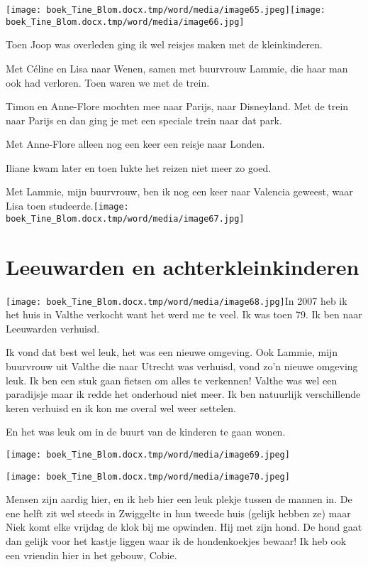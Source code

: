 \documentclass{scrbook}
\begin{document}
{\texttt{[image: boek\_Tine\_Blom.docx.tmp/word/media/image65.jpeg]}\texttt{[image: boek\_Tine\_Blom.docx.tmp/word/media/image66.jpg]}

Toen Joop was overleden ging ik wel reisjes maken met de kleinkinderen. 

Met C\'{e}line en Lisa naar Wenen, samen met buurvrouw Lammie, die haar man ook had verloren. Toen waren we met de trein. 

Timon en Anne-Flore mochten mee naar Parijs, naar Disneyland. Met de trein naar Parijs en dan ging je met een speciale trein naar dat park. 

Met Anne-Flore alleen nog een keer een reisje naar Londen. 

Iliane kwam later en toen lukte het reizen niet meer zo goed. 

Met Lammie, mijn buurvrouw, ben ik nog een keer naar Valencia geweest, waar Lisa toen studeerde.\texttt{[image: boek\_Tine\_Blom.docx.tmp/word/media/image67.jpg]} 

\chapter{\label{ref-014}Leeuwarden en achterkleinkinderen}

\texttt{[image: boek\_Tine\_Blom.docx.tmp/word/media/image68.jpg]}In 2007 heb ik het huis in Valthe verkocht want het werd me te veel. Ik was toen 79. Ik ben naar Leeuwarden verhuisd.

Ik vond dat best wel leuk, het was een nieuwe omgeving. Ook Lammie, mijn buurvrouw uit Valthe die naar Utrecht was verhuisd, vond zo’n nieuwe omgeving leuk. Ik ben een stuk gaan fietsen om alles te verkennen! Valthe was wel een paradijsje maar ik redde het onderhoud niet meer. Ik ben natuurlijk verschillende keren verhuisd en ik kon me overal wel weer settelen. 

En het was leuk om in de buurt van de kinderen te gaan wonen. 

\texttt{[image: boek\_Tine\_Blom.docx.tmp/word/media/image69.jpeg]}

\texttt{[image: boek\_Tine\_Blom.docx.tmp/word/media/image70.jpeg]}

Mensen zijn aardig hier, en ik heb hier een leuk plekje tussen de mannen in. De ene helft zit wel steeds in Zwiggelte in hun tweede huis (gelijk hebben ze) maar Niek komt elke vrijdag de klok bij me opwinden. Hij met zijn hond. De hond gaat dan gelijk voor het kastje liggen waar ik de hondenkoekjes bewaar! Ik heb ook een vriendin hier in het gebouw, Cobie. 

}
\end{document}
